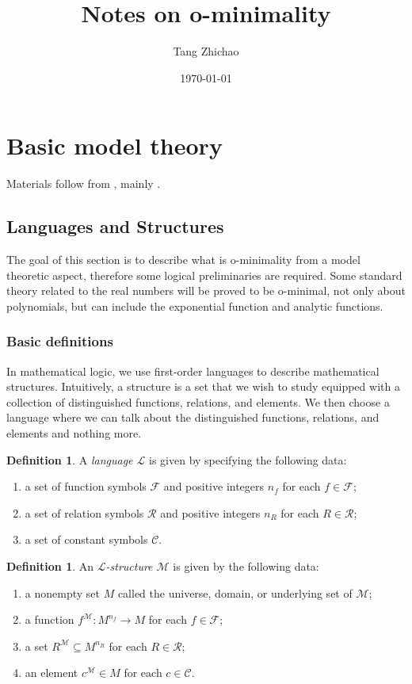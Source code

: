 \documentclass{amsart}
\title{Notes on o-minimality}
\author{Tang Zhichao}
\date{\today}
\theoremstyle{definition}
\newtheorem{definition}[theorem]{Definition}
\numberwithin{equation}{section}
\begin{document}
\maketitle

\section{Basic model theory}
Materials follow from \cite{zbMATH01821671,zbMATH01160037},
mainly \cite{zbMATH01821671}.
\subsection{Languages and Structures}
The goal of this section is to describe what is o-minimality
from a model theoretic aspect,
therefore some logical preliminaries are required.
Some standard theory related to the real numbers
will be proved to be o-minimal,
not only about polynomials, but can include the exponential function and analytic functions.

\subsubsection{Basic definitions}
In mathematical logic,
we use first-order languages to describe mathematical structures.
Intuitively, a structure is a set that we wish to study equipped with a collection of distinguished functions, relations, and elements.
We then choose a language where we can talk about the distinguished functions, relations, and elements and nothing more.

\begin{definition}
  A \emph{language $\mathcal{L}$} is given by specifying the following data:
  \begin{enumerate}[label = {(\roman*)}]
    \item a set of function symbols $\mathcal{F}$ and positive integers $n_f$ for each $f \in \mathcal{F}$;
    \item a set of relation symbols $\mathcal{R}$ and positive integers $n_R$ for each $R \in \mathcal{R}$;
    \item a set of constant symbols $\mathcal{C}$.
  \end{enumerate}
\end{definition}

\begin{definition}
  An \emph{$\mathcal{L}$-structure $\mathcal{M}$} is given by the following data:
  \begin{enumerate}[label = {(\roman*)}]
    \item a nonempty set $M$ called the universe, domain, or underlying set of $\mathcal{M}$;
    \item a function $f^{\mathcal{M}} : M^{n_f} \to M$ for each $f \in \mathcal{F}$;
    \item a set $R^{\mathcal{M}} \subseteq M^{n_R}$ for each $R \in \mathcal{R}$;
    \item an element $c^{\mathcal{M}} \in M$ for each $c \in \mathcal{C}$.
  \end{enumerate}
\end{definition}
\end{document}
